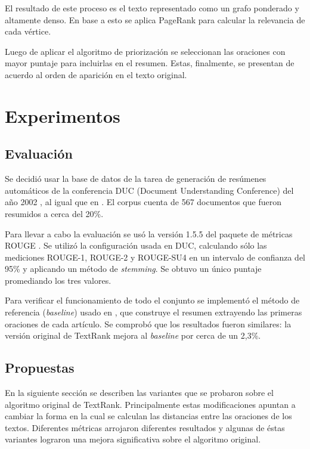 \documentclass{llncs}
\begin{document}
El resultado de este proceso es el texto representado como un grafo ponderado y altamente denso. En base a esto se aplica PageRank para calcular la relevancia de cada vértice.

Luego de aplicar el algoritmo de priorización se seleccionan las oraciones con mayor puntaje para incluirlas en el resumen. Estas, finalmente, se presentan de acuerdo al orden de aparición en el texto original.


\section{Experimentos}

\subsection{Evaluación}
Se decidió usar la base de datos de la tarea de generación de resúmenes automáticos de la conferencia DUC (Document Understanding Conference) del año 2002 \cite{duc2002-guidelines}, al igual que en \cite{mihalcea-tarau}. El corpus cuenta de 567 documentos que fueron resumidos a cerca del 20\%.

Para llevar a cabo la evaluación se usó la versión 1.5.5 del paquete de métricas ROUGE \cite{Lin2004a}. Se utilizó la configuración usada en DUC, calculando sólo las mediciones ROUGE-1, ROUGE-2 y ROUGE-SU4 en un intervalo de confianza del 95\% y aplicando un método de \textit{stemming}. Se obtuvo un único puntaje promediando los tres valores.

Para verificar el funcionamiento de todo el conjunto se implementó el método de referencia (\textit{baseline}) usado en \cite{mihalcea-tarau}, que construye el resumen extrayendo las primeras oraciones de cada artículo. Se comprobó que los resultados fueron similares: la versión original de TextRank mejora al \textit{baseline} por cerca de un 2,3\%.

\subsection{Propuestas}
En la siguiente sección se describen las variantes que se probaron sobre el algoritmo original de
TextRank. Principalmente estas modificaciones apuntan a cambiar la forma en la cual se calculan las distancias entre las oraciones de los textos. Diferentes métricas arrojaron diferentes resultados y algunas de éstas variantes lograron una mejora significativa sobre el algoritmo original.
\end{document}
